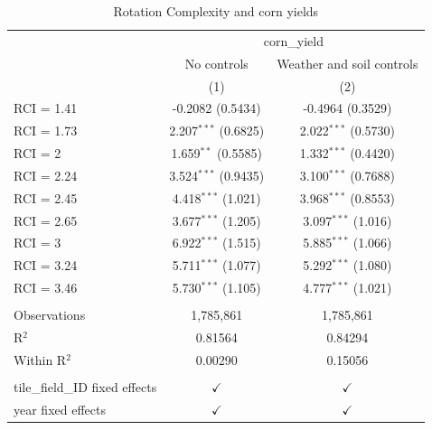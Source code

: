 
\begin{table}[H]
   \caption{\label{tab:corn_rci} Rotation Complexity and corn yields}
   \bigskip
   \centering
   \begin{tabular}{lcc}
      \toprule
       & \multicolumn{2}{c}{corn\_yield}\\
                                      & No controls            & Weather and soil controls \\   
                                      & (1)                    & (2)\\  
      \midrule 
      RCI = 1.41                      & -0.2082 (0.5434)       & -0.4964 (0.3529)\\   
      RCI = 1.73                      & 2.207$^{***}$ (0.6825) & 2.022$^{***}$ (0.5730)\\   
      RCI = 2                         & 1.659$^{**}$ (0.5585)  & 1.332$^{***}$ (0.4420)\\   
      RCI = 2.24                      & 3.524$^{***}$ (0.9435) & 3.100$^{***}$ (0.7688)\\   
      RCI = 2.45                      & 4.418$^{***}$ (1.021)  & 3.968$^{***}$ (0.8553)\\   
      RCI = 2.65                      & 3.677$^{***}$ (1.205)  & 3.097$^{***}$ (1.016)\\   
      RCI = 3                         & 6.922$^{***}$ (1.515)  & 5.885$^{***}$ (1.066)\\   
      RCI = 3.24                      & 5.711$^{***}$ (1.077)  & 5.292$^{***}$ (1.080)\\   
      RCI = 3.46                      & 5.730$^{***}$ (1.105)  & 4.777$^{***}$ (1.021)\\   
       \\
      Observations                    & 1,785,861              & 1,785,861\\  
      R$^2$                           & 0.81564                & 0.84294\\  
      Within R$^2$                    & 0.00290                & 0.15056\\  
       \\
      tile\_field\_ID fixed effects   & $\checkmark$           & $\checkmark$\\   
      year fixed effects              & $\checkmark$           & $\checkmark$\\   
      \bottomrule
   \end{tabular}
\end{table}


